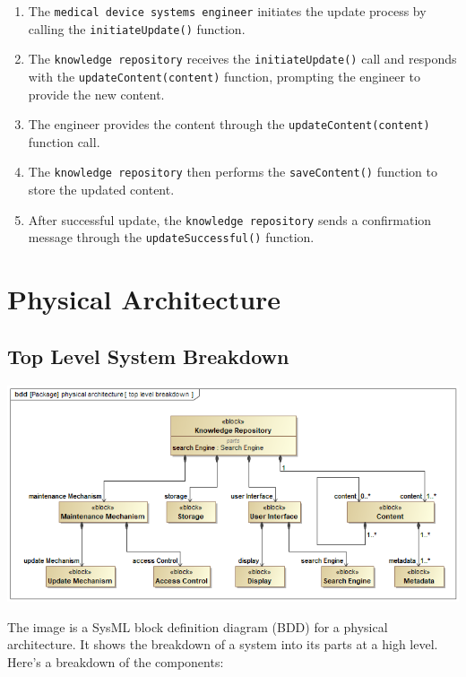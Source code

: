 \documentclass[
  letterpaper,
  DIV=11,
  numbers=noendperiod]{scrreprt}
\begin{document}
\begin{enumerate}
\def\labelenumi{\arabic{enumi}.}
\item
  The \texttt{medical\ device\ systems\ engineer} initiates the update
  process by calling the \texttt{initiateUpdate()} function.
\item
  The \texttt{knowledge\ repository} receives the
  \texttt{initiateUpdate()} call and responds with the
  \texttt{updateContent(content)} function, prompting the engineer to
  provide the new content.
\item
  The engineer provides the content through the
  \texttt{updateContent(content)} function call.
\item
  The \texttt{knowledge\ repository} then performs the
  \texttt{saveContent()} function to store the updated content.
\item
  After successful update, the \texttt{knowledge\ repository} sends a
  confirmation message through the \texttt{updateSuccessful()} function.
\end{enumerate}


\chapter{Physical Architecture}\label{physical-architecture}

\section{Top Level System Breakdown}\label{top-level-system-breakdown}

\includegraphics{images/paste-1.png}

The image is a SysML block definition diagram (BDD) for a physical
architecture. It shows the breakdown of a system into its parts at a
high level. Here's a breakdown of the components:
\end{document}
